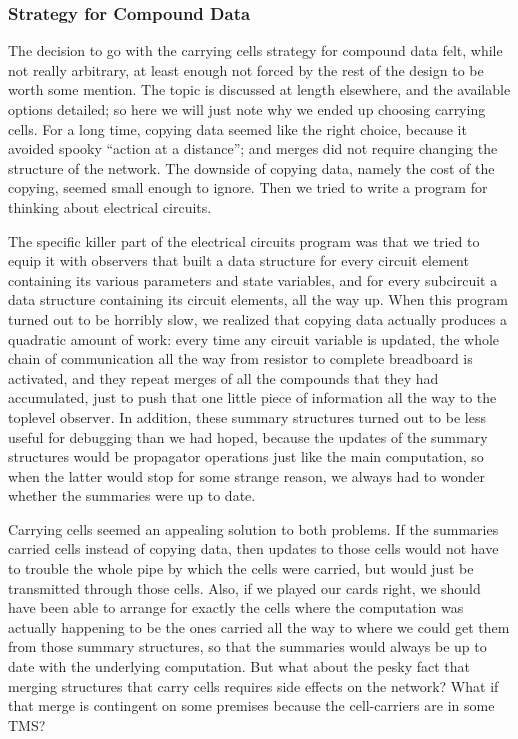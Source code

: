 \documentclass[12pt,letterpaper,english]{article}
\begin{document}

\subsubsection{Strategy for Compound Data}
\label{strategy-for-compound-data}

The decision to go with the carrying cells strategy for
compound data felt, while not really arbitrary, at least enough not
forced by the rest of the design to be worth some mention.  The topic
is discussed at length elsewhere, and the available options detailed;
so here we will just note why we ended up choosing carrying cells.
For a long time, copying data seemed like the right choice, because it
avoided spooky ``action at a distance''; and merges did not require
changing the structure of the network.  The downside of copying data,
namely the cost of the copying, seemed small enough to ignore.  Then
we tried to write a program for thinking about electrical circuits.

The specific killer part of the electrical circuits program was that
we tried to equip it with observers that built a data structure for
every circuit element containing its various parameters and state
variables, and for every subcircuit a data structure containing its
circuit elements, all the way up.  When this program turned out to be
horribly slow, we realized that copying data actually produces a
quadratic amount of work: every time any circuit variable is updated,
the whole chain of communication all the way from resistor to complete
breadboard is activated, and they repeat merges of all the compounds
that they had accumulated, just to push that one little piece of
information all the way to the toplevel observer.  In addition, these
summary structures turned out to be less useful for debugging than we
had hoped, because the updates of the summary structures would be
propagator operations just like the main computation, so when the
latter would stop for some strange reason, we always had to wonder
whether the summaries were up to date.

Carrying cells seemed an appealing solution to both problems.  If the
summaries carried cells instead of copying data, then updates to those
cells would not have to trouble the whole pipe by which the cells were
carried, but would just be transmitted through those cells.  Also, if
we played our cards right, we should have been able to arrange for
exactly the cells where the computation was actually happening to be
the ones carried all the way to where we could get them from those
summary structures, so that the summaries would always be up to date
with the underlying computation.  But what about the pesky fact that
merging structures that carry cells requires side effects on the
network?  What if that merge is contingent on some premises because
the cell-carriers are in some TMS?
\end{document}
